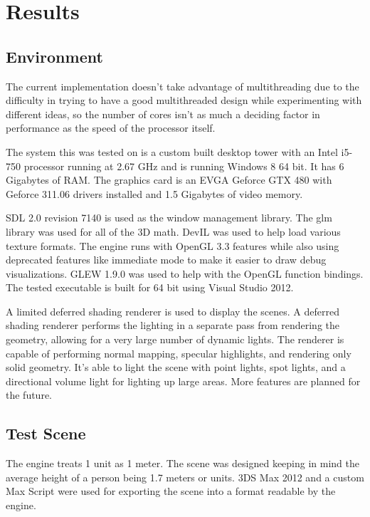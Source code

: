 \documentclass[12pt]{ucthesis}
\begin{document}
\chapter{Results}
\label{results}

\section{Environment}
\label{environment}

The current implementation doesn't take advantage of multithreading due to the difficulty in trying to have a good multithreaded design while experimenting with different ideas, so the number of cores isn't as much a deciding factor in performance as the speed of the processor itself.

The system this was tested on is a custom built desktop tower with an Intel i5-750 processor running at 2.67 GHz and is running Windows 8 64 bit.
It has 6 Gigabytes of RAM.
The graphics card is an EVGA Geforce GTX 480 with Geforce 311.06 drivers installed and 1.5 Gigabytes of video memory.

SDL 2.0 revision 7140 is used as the window management library.
The glm library was used for all of the 3D math.
DevIL was used to help load various texture formats.
The engine runs with OpenGL 3.3 features while also using deprecated features like immediate mode to make it easier to draw debug visualizations.
GLEW 1.9.0 was used to help with the OpenGL function bindings.
The tested executable is built for 64 bit using Visual Studio 2012.

A limited deferred shading renderer is used to display the scenes.
A deferred shading renderer performs the lighting in a separate pass from rendering the geometry, allowing for a very large number of dynamic lights.
The renderer is capable of performing normal mapping, specular highlights, and rendering only solid geometry.
It's able to light the scene with point lights, spot lights, and a directional volume light for lighting up large areas.
More features are planned for the future.

\section{Test Scene}
\label{test-scene}

The engine treats 1 unit as 1 meter.
The scene was designed keeping in mind the average height of a person being 1.7 meters or units.
3DS Max 2012 and a custom Max Script were used for exporting the scene into a format readable by the engine.
\end{document}
